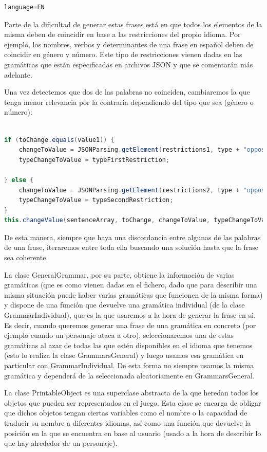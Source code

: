 \begin{verbatim}
language=EN
\end{verbatim}

Parte de la dificultad de generar estas frases está en que todos los elementos de la misma deben de coincidir en base a las restricciones del propio idioma. Por ejemplo, los nombres, verbos y determinantes de una frase en español deben de coincidir en género y número. Este tipo de restricciones vienen dadas en las gramáticas que están especificadas en archivos JSON y que se comentarán más adelante.

Una vez detectemos que dos de las palabras no coinciden, cambiaremos la que tenga menor relevancia por la contraria dependiendo del tipo que sea (género o número):

\begin{lstlisting}[language=java]

if (toChange.equals(value1)) {
    changeToValue = JSONParsing.getElement(restrictions1, type + "opposite");
    typeChangeToValue = typeFirstRestriction; 
     
} else {
    changeToValue = JSONParsing.getElement(restrictions2, type + "opposite");
    typeChangeToValue = typeSecondRestriction;
}
this.changeValue(sentenceArray, toChange, changeToValue, typeChangeToValue);

\end{lstlisting}

De esta manera, siempre que haya una discordancia entre algunas de las palabras de una frase, iteraremos entre toda ella buscando una solución hasta que la frase sea coherente.

La clase GeneralGrammar, por su parte, obtiene la información de varias gramáticas (que es como vienen dadas en el fichero, dado que para describir una misma situación puede haber varias gramáticas que funcionen de la misma forma) y dispone de una función que devuelve una gramática individual (de la clase GrammarIndividual), que es la que usaremos a la hora de generar la frase en sí. Es decir, cuando queremos generar una frase de una gramática en concreto (por ejemplo cuando un personaje ataca a otro), seleccionaremos una de estas gramáticas al azar de todas las que estén disponibles en el idioma que tenemos (esto lo realiza la clase GrammarsGeneral) y luego usamos esa gramática en particular con GrammarIndividual.  De esta forma no siempre usamos la misma gramática y dependerá de la seleccionada aleatoriamente en GrammarsGeneral.

La clase PrintableObject es una superclase abstracta de la que heredan todos los objetos que pueden ser representados en el juego. Esta clase se encarga de obligar que dichos objetos tengan ciertas variables como el nombre o la capacidad de traducir su nombre a diferentes idiomas, así como una función que devuelve la posición en la que se encuentra en base al usuario (usado a la hora de describir lo que hay alrededor de un personaje).


